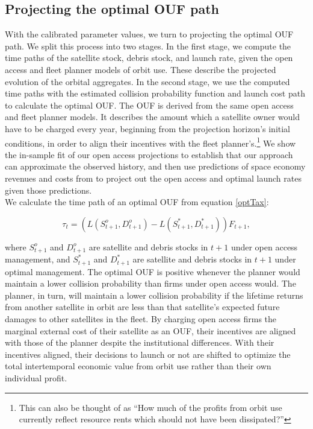 \documentclass[9pt,twoside,lineno]{pnas-new}
\begin{document}
\subsection{Projecting the optimal OUF path}

With the calibrated parameter values, we turn to projecting the optimal OUF path. We split this process into two stages. In the first stage, we compute the time paths of the satellite stock, debris stock, and launch rate, given the open access and fleet planner models of orbit use. These describe the projected evolution of the orbital aggregates. In the second stage, we use the computed time paths with the estimated collision probability function and launch cost path to calculate the optimal OUF. The OUF is derived from the same open access and fleet planner models. It describes the amount which a satellite owner would have to be charged every year, beginning from the projection horizon's initial conditions, in order to align their incentives with the fleet planner's.\footnote{This can also be thought of as ``How much of the profits from orbit use currently reflect resource rents which should not have been dissipated?'' } We show the in-sample fit of our open access projections to establish that our approach can approximate the observed history, and then use predictions of space economy revenues and costs from \citep{MSreport} to project out the open access and optimal launch rates given those predictions. \\

We calculate the time path of an optimal OUF from equation \ref{optTax}:

\begin{equation}
\label{optTax}
\tau_t = (L(S^o_{t+1},D^o_{t+1}) - L(S^*_{t+1},D^*_{t+1}))F_{t+1},
\end{equation}

where $S^o_{t+1}$ and $D^o_{t+1}$ are satellite and debris stocks in $t+1$ under open access management, and $S^*_{t+1}$ and $D^*_{t+1}$ are satellite and debris stocks in $t+1$ under optimal management. The optimal OUF is positive whenever the planner would maintain a lower collision probability than firms under open access would. The planner, in turn, will maintain a lower collision probability if the lifetime returns from another satellite in orbit are less than that satellite's expected future damages to other satellites in the fleet. By charging open access firms the marginal external cost of their satellite as an OUF, their incentives are aligned with those of the planner despite the institutional differences. With their incentives aligned, their decisions to launch or not are shifted to optimize the total intertemporal economic value from orbit use rather than their own individual profit. \\
\end{document}
